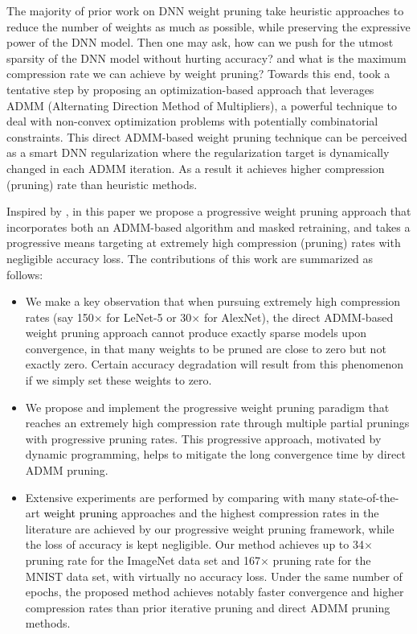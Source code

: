 \documentclass{article} %
\begin{document}
The majority of prior work on DNN weight pruning take heuristic approaches to reduce the number of weights as much as possible, while preserving the expressive power of the DNN model.
Then one may ask, how can we push for the utmost sparsity of the DNN model without hurting accuracy? and what is the maximum compression rate we can achieve by weight pruning?
Towards this end, \citet{zhang2018systematic} took a tentative step by proposing an optimization-based approach that leverages ADMM (Alternating Direction Method of Multipliers), a powerful technique to deal with non-convex optimization problems with potentially combinatorial constraints. This direct ADMM-based weight pruning technique can be perceived as a smart DNN regularization where the regularization target is dynamically changed in each ADMM iteration. As a result it achieves higher compression (pruning) rate than heuristic methods.

Inspired by \citet{zhang2018systematic}, in this paper we propose a progressive weight pruning approach that incorporates both an ADMM-based algorithm and masked retraining, and takes a progressive means targeting at extremely high compression (pruning) rates with negligible accuracy loss. The contributions of this work are summarized as follows:
\begin{itemize}
\item We make a key observation that when pursuing extremely high compression rates (say 150$\times$ for LeNet-5 or 30$\times$ for AlexNet), the direct ADMM-based weight pruning approach \citep{zhang2018systematic} cannot produce exactly sparse models upon convergence, in that many weights to be pruned are close to zero but not exactly zero. Certain accuracy degradation will result from this phenomenon if we simply set these weights to zero.
\item We propose and implement the progressive weight pruning paradigm that reaches an extremely high compression rate through multiple partial prunings with progressive pruning rates. This progressive approach, motivated by dynamic programming, helps to mitigate the long convergence time by direct ADMM pruning.
\item Extensive experiments are performed by comparing with many state-of-the-art \textcolor{black}{weight pruning} approaches and the highest compression rates in the literature are achieved by our progressive weight pruning framework, while the loss of accuracy is kept negligible. Our method achieves up to 34$\times$ pruning rate for the ImageNet data set and 167$\times$ pruning rate for the MNIST data set, with virtually no accuracy loss. Under the same number of epochs, the proposed method achieves notably faster convergence and higher compression rates than prior iterative pruning and direct ADMM pruning methods.
\end{itemize}
\end{document}
